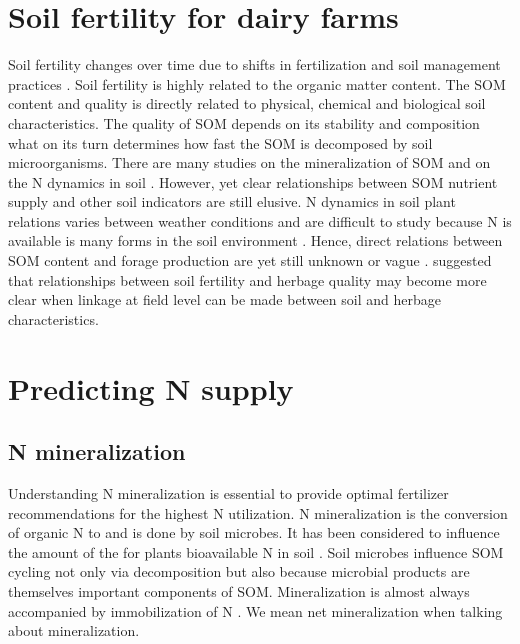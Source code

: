 \documentclass[10pt,twoside,dutch,english]{report}
\begin{document}
\section{Soil fertility for dairy farms} 
Soil fertility changes over time due to shifts in fertilization and soil management practices \citep{Hanegraaf2009}. Soil fertility is highly related to the organic matter content. The SOM content and quality is directly related to physical, chemical and biological soil characteristics. The quality of SOM depends on its stability and composition what on its turn determines how fast the SOM is decomposed by soil microorganisms. There are many studies on the mineralization of SOM and on the N dynamics in soil \citep{Wander2004, Haynes2005,Ros2011}. However, yet clear relationships between SOM nutrient supply and other soil indicators are still elusive. N dynamics in soil plant relations varies between weather conditions and are difficult to study because N is available is many forms in the soil environment \citep{Nannipieri2009}. Hence, direct relations between SOM content and forage production are yet still unknown or vague \citep{Hanegraaf2009}. \citet{Reijneveld2014} suggested that relationships between soil fertility and herbage quality may become more clear when linkage at field level can be made between soil and herbage characteristics. 

\section{Predicting N supply }
\subsection{N mineralization}
Understanding N mineralization is essential to provide optimal fertilizer recommendations for the highest N utilization. N mineralization is the conversion of organic N to  and is done by soil microbes.  It has been considered to influence the amount of the for plants bioavailable N in soil \citep{Myrold2008, Geisseler2010}. Soil microbes influence SOM cycling not only via decomposition but also because microbial products are themselves important components of SOM. Mineralization is almost always accompanied by immobilization of N \citep{Powlson1993}. We mean net mineralization when talking about mineralization. 
\end{document}
